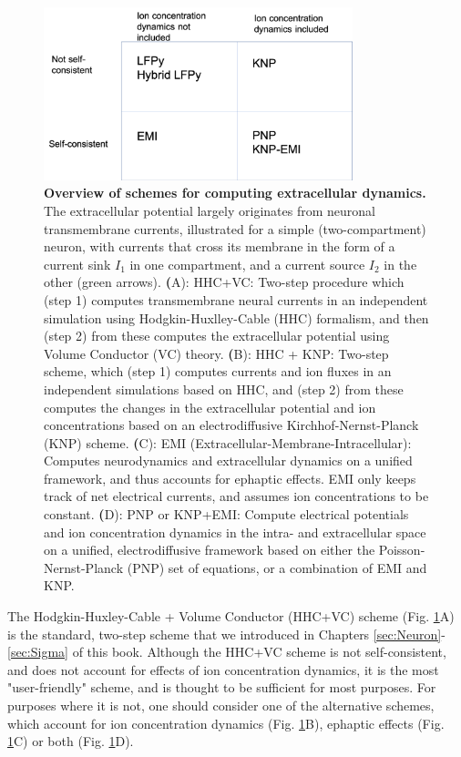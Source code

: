 \begin{figure}[!ht]
\begin{center}
\includegraphics[width=0.8\textwidth]{Figures/Schemes/schemes.png}
\end{center}
\caption{\textbf{Overview of schemes for computing extracellular dynamics.} The extracellular potential largely originates from neuronal transmembrane currents, illustrated for a simple (two-compartment) neuron, with currents that cross its membrane in the form of a current sink $I_1$ in one compartment, and a current source $I_2$ in the other (green arrows). {\textbf (A)}: HHC+VC: Two-step procedure which (step 1) computes transmembrane neural currents in an independent simulation using Hodgkin-Huxlley-Cable (HHC) formalism, and then (step 2) from these computes the extracellular potential using Volume Conductor (VC) theory. {\textbf (B)}: HHC + KNP: Two-step scheme, which (step 1) computes currents and ion fluxes in an independent simulations based on HHC, and (step 2) from these computes the changes in the extracellular potential and ion concentrations based on an electrodiffusive Kirchhof-Nernst-Planck (KNP) scheme. {\textbf (C)}: EMI (Extracellular-Membrane-Intracellular): Computes neurodynamics and extracellular dynamics on a unified framework, and thus accounts for ephaptic effects. EMI only keeps track of net electrical currents, and assumes ion concentrations to be constant. {\textbf (D)}: PNP or KNP+EMI: Compute electrical potentials and ion concentration dynamics in the intra- and extracellular space on a unified, electrodiffusive framework based on either the Poisson-Nernst-Planck (PNP) set of equations, or a combination of EMI and KNP. 
}
\label{Schemes:fig:schemes}
\end{figure}

The Hodgkin-Huxley-Cable + Volume Conductor (HHC+VC) scheme (Fig. \ref{Schemes:fig:schemes}A) is the standard, two-step scheme that we introduced in Chapters \ref{sec:Neuron}-\ref{sec:Sigma} of this book. Although the HHC+VC scheme is not self-consistent, and does not account for effects of ion concentration dynamics, it is the most "user-friendly" scheme, and is thought to be sufficient for most purposes. For purposes where it is not, one should consider one of the alternative schemes, which account for ion concentration dynamics (Fig. \ref{Schemes:fig:schemes}B), ephaptic effects (Fig. \ref{Schemes:fig:schemes}C) or both (Fig. \ref{Schemes:fig:schemes}D).


